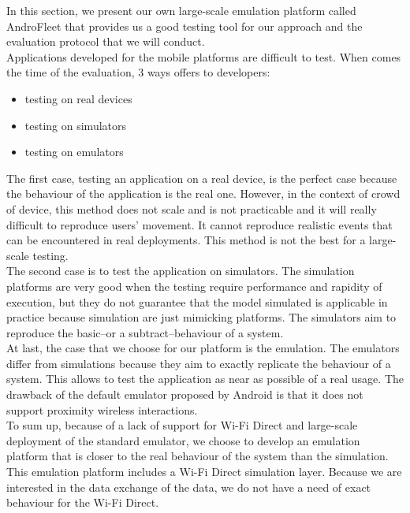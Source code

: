 

In this section, we present our own large-scale emulation platform called AndroFleet that provides us a good testing tool for our approach and the evaluation protocol that we will conduct.
\\

Applications developed for the mobile platforms are difficult to test.
When comes the time of the evaluation, 3 ways offers to developers:
\begin{itemize}
    \item testing on real devices
    \item testing on simulators
    \item testing on emulators
\end{itemize}

The first case, testing an application on a real device, is the perfect case because the behaviour of the application is the real one.
However, in the context of crowd of device, this method does not scale and is not practicable and it will really difficult to reproduce users' movement.
It cannot reproduce realistic events that can be encountered in real deployments. 
This method is not the best for a large-scale testing.
\\

The second case is to test the application on simulators.
The simulation platforms are very good when the testing require performance and rapidity of execution, but they do not guarantee that the model simulated is applicable in practice because simulation are just mimicking platforms.
The simulators aim to reproduce the basic--or a subtract--behaviour of a system.
\\

At last, the case that we choose for our platform is the emulation.
The emulators differ from simulations because they aim to exactly replicate the behaviour of a system.
This allows to test the application as near as possible of a real usage.
The drawback of the default emulator proposed by Android is that it does not support proximity wireless interactions.
\\

To sum up, because of a lack of support for Wi-Fi Direct and large-scale deployment of the standard emulator, we choose to develop an emulation platform that is closer to the real behaviour of the system than the simulation.
This emulation platform includes a Wi-Fi Direct simulation layer.
Because we are interested in the data exchange of the data, we do not have a need of exact behaviour for the Wi-Fi Direct.

